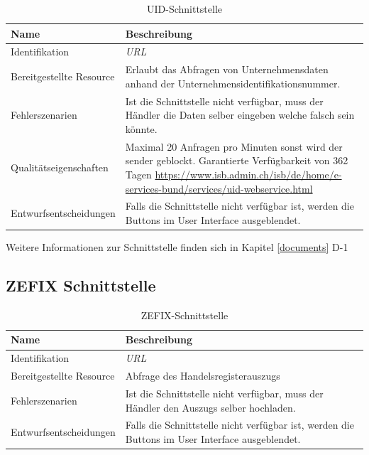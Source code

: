 \begin{table}[H]
	\centering
	\caption{UID-Schnittstelle}
	\begin{tabular}{ | p{4cm} | p{11cm} | }
		\toprule
		{\textbf{Name}} & {\textbf{Beschreibung}} \\
		\midrule
		Identifikation & \textit{\gls{URL}}\\ \hline
		Bereitgestellte Resource & Erlaubt das Abfragen von Unternehmensdaten anhand der Unternehmensidentifikationsnummer. \\ \hline
		Fehlerszenarien & Ist die Schnittstelle nicht verfügbar, muss der Händler die Daten selber eingeben welche falsch sein könnte.\\ \hline
		Qualitätseigenschaften & Maximal 20 Anfragen pro Minuten sonst wird der sender geblockt.  Garantierte Verfügbarkeit von 362 Tagen \url{https://www.isb.admin.ch/isb/de/home/e-services-bund/services/uid-webservice.html}\\ \hline
		Entwurfsentscheidungen & Falls die Schnittstelle nicht verfügbar ist, werden die Buttons im User Interface ausgeblendet.\\
		\bottomrule
	\end{tabular}
\end{table}

Weitere Informationen zur Schnittstelle finden sich in Kapitel \ref{documents} D-1

\subsection{ZEFIX Schnittstelle}

\begin{table}[H]
	\centering
	\caption{ZEFIX-Schnittstelle}
	\begin{tabular}{  | p{4cm} | p{11cm} | }
		\toprule
		{\textbf{Name}} & {\textbf{Beschreibung}} \\
		\midrule
		Identifikation & \textit{\gls{URL}}\\ \hline
		Bereitgestellte Resource & Abfrage des Handelsregisterauszugs \\ \hline
		Fehlerszenarien & Ist die Schnittstelle nicht verfügbar, muss der Händler den Auszugs selber hochladen.\\ \hline
		Entwurfsentscheidungen & Falls die Schnittstelle nicht verfügbar ist, werden die Buttons im User Interface ausgeblendet.\\
		\bottomrule
	\end{tabular}
\end{table}

